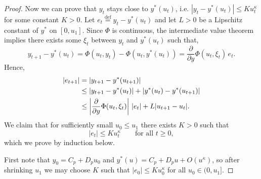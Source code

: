 \documentclass{article}
\newcommand{\defi}{\stackrel{\mathrm{\scriptscriptstyle def}}{=}}
\begin{document}
\begin{proof}
    Now we can prove that $y_t$ stays close to $y^*(u_t)$, i.e. $|y_t-y^*(u_t)|\le K u_t^\kappa$ for some constant $K>0$.
    Let $e_t\defi y_t-y^*(u_t)$ and let $L>0$ be a Lipschitz constant of $y^*$
    on $[0,u_1]$.
    Since $\Phi$ is continuous, the intermediate value theorem implies there exists some $\xi_t$ between $y_t$ and
    $y^*(u_t)$ such that,
    \[
        y_{t+1}-y^*(u_t)
        = \Phi(u_t,y_t)-\Phi(u_t,y^*(u_t))
        = \frac{\partial}{\partial y}\Phi(u_t,\xi_t)\,e_t.
    \]
    Hence,
    \begin{align}
        \label{eq:e-recursion}
        |e_{t+1}|
        &= |y_{t+1}-y^*(u_{t+1})| \notag\\
        &\leq |y_{t+1}-y^*(u_t)| + |y^*(u_t)-y^*(u_{t+1})| \notag\\
        &\leq \left|\frac{\partial}{\partial y}\Phi(u_t,\xi_t)\right|\,|e_t| + L|u_{t+1}-u_t|.
    \end{align}
    We claim that for sufficiently small $u_0\le u_1$ there exists $K>0$ such that
    \begin{equation}\label{eq:tube}
        |e_t|\le K u_t^\kappa
        \qquad\text{for all }t\ge 0,
    \end{equation}
    which we prove by induction below.

    First note that $y_0=C_p+D_pu_0$ and $y^*(u)=C_p+D_pu+O(u^\kappa)$, so after shrinking $u_1$
    we may choose $K$ such that $|e_0|\le K u_0^\kappa$ for all $u_0\in(0,u_1]$.
    


\end{proof}
\end{document}
